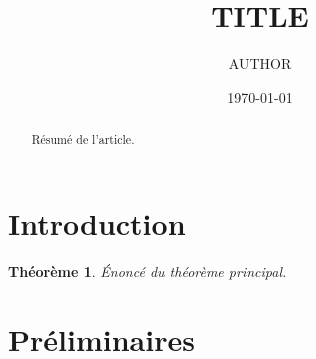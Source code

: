 \documentclass[11pt]{article}
\title{{{TITLE}}}
\author{{{AUTHOR}}}
\date{\today}
\theoremstyle{plain}
\newtheorem{theorem}{Théorème}[section]
\theoremstyle{definition}
\theoremstyle{remark}
\begin{document}
\maketitle
\begin{abstract}
Résumé de l'article.
\end{abstract}

\section{Introduction}
\begin{theorem}\label{thm:principal}
Énoncé du théorème principal.
\end{theorem}

\section{Préliminaires}



\end{document}
